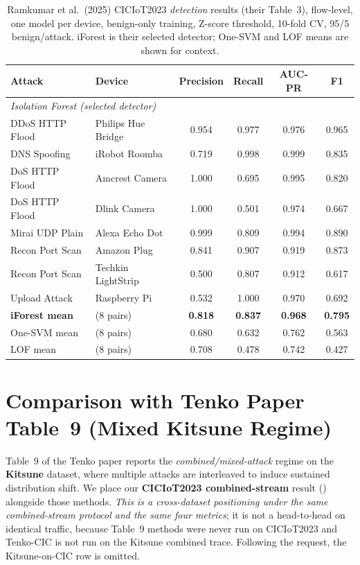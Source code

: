 \documentclass[10pt]{article}
\begin{document}
\begin{table}[h]
\centering
\caption{Ramkumar et al.\ (2025) CICIoT2023 \emph{detection} results (their Table~3),
flow-level, one model per device, benign-only training, Z-score threshold, 10-fold CV,
95/5 benign/attack. iForest is their selected detector; One-SVM and LOF means are shown for
context.}
\label{tab:ramkumar}
\begin{tabular}{ll cccc}
\toprule
\textbf{Attack} & \textbf{Device} & \textbf{Precision} & \textbf{Recall} & \textbf{AUC-PR} & \textbf{F1} \\
\midrule
\multicolumn{6}{l}{\emph{Isolation Forest (selected detector)}}\\
DDoS HTTP Flood  & Philips Hue Bridge & 0.954 & 0.977 & 0.976 & 0.965 \\
DNS Spoofing     & iRobot Roomba      & 0.719 & 0.998 & 0.999 & 0.835 \\
DoS HTTP Flood   & Amcrest Camera     & 1.000 & 0.695 & 0.995 & 0.820 \\
DoS HTTP Flood   & Dlink Camera       & 1.000 & 0.501 & 0.974 & 0.667 \\
Mirai UDP Plain  & Alexa Echo Dot     & 0.999 & 0.809 & 0.994 & 0.890 \\
Recon Port Scan  & Amazon Plug        & 0.841 & 0.907 & 0.919 & 0.873 \\
Recon Port Scan  & Techkin LightStrip & 0.500 & 0.807 & 0.912 & 0.617 \\
Upload Attack    & Raspberry Pi       & 0.532 & 1.000 & 0.970 & 0.692 \\
\midrule
\textbf{iForest mean}  & (8 pairs) & \textbf{0.818} & \textbf{0.837} & \textbf{0.968} & \textbf{0.795} \\
One-SVM mean           & (8 pairs) & 0.680 & 0.632 & 0.762 & 0.563 \\
LOF mean               & (8 pairs) & 0.708 & 0.478 & 0.742 & 0.427 \\
\bottomrule
\end{tabular}
\end{table}

\section{Comparison with Tenko Paper Table~9 (Mixed Kitsune Regime)}
\label{sec:table9}

Table~9 of the Tenko paper reports the \emph{combined/mixed-attack} regime on the
\textbf{Kitsune} dataset, where multiple attacks are interleaved to induce sustained
distribution shift. We place our \textbf{CICIoT2023 combined-stream} result
() alongside those methods. \emph{This is a cross-dataset positioning under
the same combined-stream protocol and the same four metrics}; it is not a head-to-head on
identical traffic, because Table~9 methods were never run on CICIoT2023 and Tenko-CIC is not
run on the Kitsune combined trace. Following the request, the Kitsune-on-CIC row is omitted.
\end{document}
